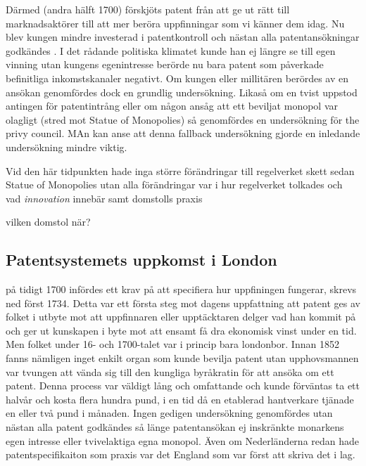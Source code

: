 Därmed (andra hälft 1700) förskjöts patent från att ge ut rätt till marknadsaktörer till att mer beröra
uppfinningar som vi känner dem idag. Nu blev kungen mindre investerad i patentkontroll och nästan alla
patentansökningar godkändes \cite{ochra}. I det rådande politiska klimatet kunde han ej längre se till
egen vinning utan kungens egenintresse berörde nu bara patent som påverkade befinitliga inkomstskanaler
negativt. \cite{macleod2} Om kungen eller millitären berördes av en ansökan genomfördes dock en grundlig
undersökning. Likaså om en tvist uppstod antingen för patentintrång eller om någon ansåg att ett beviljat
monopol var olagligt (stred mot Statue of Monopolies) så genomfördes en undersökning för the privy
council. MAn kan anse att denna fallback undersökning gjorde en inledande undersökning mindre viktig.

Vid den här tidpunkten hade inga större förändringar till regelverket skett sedan Statue of Monopolies
utan alla förändringar var i hur regelverket tolkades och vad \emph{innovation} innebär samt domstolls
praxis

vilken domstol när?


\subsection{Patentsystemets uppkomst i London} %

på tidigt 1700 infördes ett krav på att specifiera hur uppfiningen fungerar, skrevs ned först 1734. Detta
var ett första steg mot dagens uppfattning att patent ges av folket i utbyte mot att uppfinnaren eller
upptäcktaren delger vad han kommit på och ger ut kunskapen i byte mot att ensamt få dra ekonomisk vinst
under en tid. Men folket under 16- och 1700-talet var i princip bara londonbor. Innan 1852 fanns nämligen
inget enkilt organ som kunde bevilja patent utan upphovsmannen var tvungen att vända sig till den
kungliga byråkratin för att ansöka om ett patent. Denna process var väldigt lång och omfattande och kunde
förväntas ta ett halvår och kosta flera hundra pund, i en tid då en etablerad hantverkare tjänade en
eller två pund i månaden. Ingen gedigen undersökning genomfördes utan nästan alla patent godkändes så
länge patentansökan ej inskränkte monarkens egen intresse eller tvivelaktiga egna monopol. Även om
Nederländerna redan hade patentspecifikaiton som praxis var det England som var först att skriva det i
lag.

